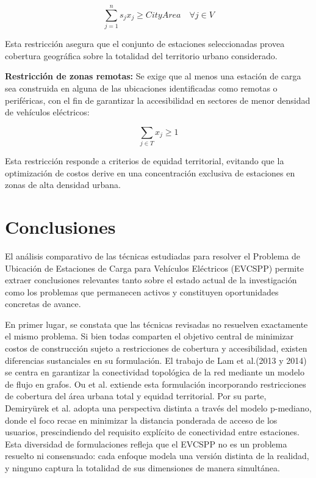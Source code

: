 \documentclass[letter, 10pt]{article}
\begin{document}
\[
\sum_{j=1}^{n} s_j x_j \geq \mathit{CityArea} \quad \forall j \in V \tag{4}
\]

Esta restricción asegura que el conjunto de estaciones seleccionadas provea cobertura 
geográfica sobre la totalidad del territorio urbano considerado.

\textbf{Restricción de zonas remotas:} Se exige que al menos una estación de carga sea 
construida en alguna de las ubicaciones identificadas como remotas o periféricas, con el 
fin de garantizar la accesibilidad en sectores de menor densidad de vehículos eléctricos:

\[
\sum_{j \in T} x_j \geq 1 \tag{5}
\]

Esta restricción responde a criterios de equidad territorial, evitando que la optimización 
de costos derive en una concentración exclusiva de estaciones en zonas de alta densidad 
urbana.


\section{Conclusiones}

El análisis comparativo de las técnicas estudiadas para resolver el Problema de Ubicación 
de Estaciones de Carga para Vehículos Eléctricos (EVCSPP) permite extraer conclusiones 
relevantes tanto sobre el estado actual de la investigación como los problemas que 
permanecen activos y constituyen oportunidades concretas de avance.

En primer lugar, se constata que las técnicas revisadas no resuelven exactamente el mismo 
problema. Si bien todas comparten el objetivo central de minimizar costos de construcción 
sujeto a restricciones de cobertura y accesibilidad, existen diferencias sustanciales en su 
formulación. El trabajo de Lam et al.(2013 y 2014) \cite{2_EVCSP_2013-ieee-conference, 6_EVCSP_formulation_complexity} se centra en garantizar la 
conectividad topológica de la red mediante un modelo de flujo en grafos. Ou et al. 
\cite{1_Solving_optimal_evcsp_problem_QUANTUM} extiende esta formulación incorporando restricciones de cobertura del área 
urbana total y equidad territorial. Por su parte, Demiryürek et al. \cite{3_optimal_placement-metaheuristic} 
adopta una perspectiva distinta a través del modelo p-mediano, donde el foco recae en 
minimizar la distancia ponderada de acceso de los usuarios, prescindiendo del requisito 
explícito de conectividad entre estaciones. Esta diversidad de formulaciones refleja que 
el EVCSPP no es un problema resuelto ni consensuado: cada enfoque modela una versión 
distinta de la realidad, y ninguno captura la totalidad de sus dimensiones de manera 
simultánea.
\end{document}

